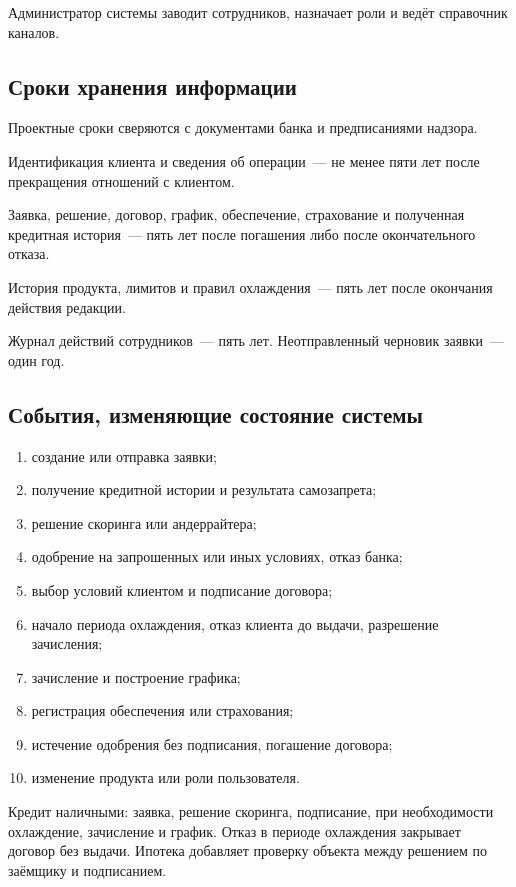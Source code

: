\documentclass[14pt,a4paper]{extarticle}
\begin{document}
Администратор системы заводит сотрудников, назначает роли и ведёт справочник каналов.

\subsection{Сроки хранения информации}

Проектные сроки сверяются с документами банка и предписаниями надзора.

Идентификация клиента и сведения об операции~--- не менее пяти лет после прекращения отношений с клиентом.

Заявка, решение, договор, график, обеспечение, страхование и полученная кредитная история~--- пять лет после погашения либо после окончательного отказа.

История продукта, лимитов и правил охлаждения~--- пять лет после окончания действия редакции.

Журнал действий сотрудников~--- пять лет. Неотправленный черновик заявки~--- один год.

\subsection{События, изменяющие состояние системы}

\begin{enumerate}
\item создание или отправка заявки;
\item получение кредитной истории и результата самозапрета;
\item решение скоринга или андеррайтера;
\item одобрение на запрошенных или иных условиях, отказ банка;
\item выбор условий клиентом и подписание договора;
\item начало периода охлаждения, отказ клиента до выдачи, разрешение зачисления;
\item зачисление и построение графика;
\item регистрация обеспечения или страхования;
\item истечение одобрения без подписания, погашение договора;
\item изменение продукта или роли пользователя.
\end{enumerate}

Кредит наличными: заявка, решение скоринга, подписание, при необходимости охлаждение, зачисление и график. Отказ в периоде охлаждения закрывает договор без выдачи. Ипотека добавляет проверку объекта между решением по заёмщику и подписанием.
\end{document}
